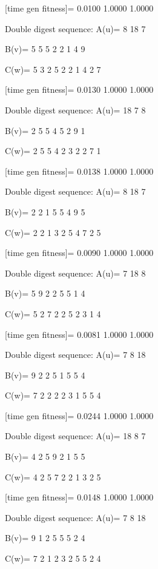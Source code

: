 [time gen fitness]=
    0.0100    1.0000    1.0000

Double digest sequence:
A(u)=
     8    18     7

B(v)=
     5     5     5     2     2     1     4     9

C(w)=
     5     3     2     5     2     2     1     4     2     7

[time gen fitness]=
    0.0130    1.0000    1.0000

Double digest sequence:
A(u)=
    18     7     8

B(v)=
     2     5     5     4     5     2     9     1

C(w)=
     2     5     5     4     2     3     2     2     7     1

[time gen fitness]=
    0.0138    1.0000    1.0000

Double digest sequence:
A(u)=
     8    18     7

B(v)=
     2     2     1     5     5     4     9     5

C(w)=
     2     2     1     3     2     5     4     7     2     5

[time gen fitness]=
    0.0090    1.0000    1.0000

Double digest sequence:
A(u)=
     7    18     8

B(v)=
     5     9     2     2     5     5     1     4

C(w)=
     5     2     7     2     2     5     2     3     1     4

[time gen fitness]=
    0.0081    1.0000    1.0000

Double digest sequence:
A(u)=
     7     8    18

B(v)=
     9     2     2     5     1     5     5     4

C(w)=
     7     2     2     2     2     3     1     5     5     4

[time gen fitness]=
    0.0244    1.0000    1.0000

Double digest sequence:
A(u)=
    18     8     7

B(v)=
     4     2     5     9     2     1     5     5

C(w)=
     4     2     5     7     2     2     1     3     2     5

[time gen fitness]=
    0.0148    1.0000    1.0000

Double digest sequence:
A(u)=
     7     8    18

B(v)=
     9     1     2     5     5     5     2     4

C(w)=
     7     2     1     2     3     2     5     5     2     4

